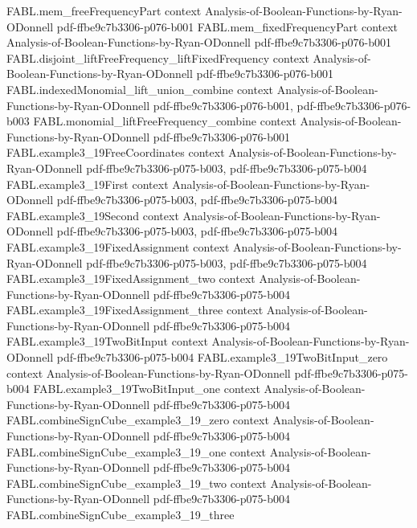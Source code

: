 \begin{theorem}
\proofstep
  {FABL.mem_freeFrequencyPart}
  {context}
  {Analysis-of-Boolean-Functions-by-Ryan-ODonnell}
  {pdf-ffbe9c7b3306-p076-b001}
\proofstep
  {FABL.mem_fixedFrequencyPart}
  {context}
  {Analysis-of-Boolean-Functions-by-Ryan-ODonnell}
  {pdf-ffbe9c7b3306-p076-b001}
\proofstep
  {FABL.disjoint_liftFreeFrequency_liftFixedFrequency}
  {context}
  {Analysis-of-Boolean-Functions-by-Ryan-ODonnell}
  {pdf-ffbe9c7b3306-p076-b001}
\proofstep
  {FABL.indexedMonomial_lift_union_combine}
  {context}
  {Analysis-of-Boolean-Functions-by-Ryan-ODonnell}
  {pdf-ffbe9c7b3306-p076-b001,
    pdf-ffbe9c7b3306-p076-b003}
\proofstep
  {FABL.monomial_liftFreeFrequency_combine}
  {context}
  {Analysis-of-Boolean-Functions-by-Ryan-ODonnell}
  {pdf-ffbe9c7b3306-p076-b001}
\proofstep
  {FABL.example3_19FreeCoordinates}
  {context}
  {Analysis-of-Boolean-Functions-by-Ryan-ODonnell}
  {pdf-ffbe9c7b3306-p075-b003,
    pdf-ffbe9c7b3306-p075-b004}
\proofstep
  {FABL.example3_19First}
  {context}
  {Analysis-of-Boolean-Functions-by-Ryan-ODonnell}
  {pdf-ffbe9c7b3306-p075-b003,
    pdf-ffbe9c7b3306-p075-b004}
\proofstep
  {FABL.example3_19Second}
  {context}
  {Analysis-of-Boolean-Functions-by-Ryan-ODonnell}
  {pdf-ffbe9c7b3306-p075-b003,
    pdf-ffbe9c7b3306-p075-b004}
\proofstep
  {FABL.example3_19FixedAssignment}
  {context}
  {Analysis-of-Boolean-Functions-by-Ryan-ODonnell}
  {pdf-ffbe9c7b3306-p075-b003,
    pdf-ffbe9c7b3306-p075-b004}
\proofstep
  {FABL.example3_19FixedAssignment_two}
  {context}
  {Analysis-of-Boolean-Functions-by-Ryan-ODonnell}
  {pdf-ffbe9c7b3306-p075-b004}
\proofstep
  {FABL.example3_19FixedAssignment_three}
  {context}
  {Analysis-of-Boolean-Functions-by-Ryan-ODonnell}
  {pdf-ffbe9c7b3306-p075-b004}
\proofstep
  {FABL.example3_19TwoBitInput}
  {context}
  {Analysis-of-Boolean-Functions-by-Ryan-ODonnell}
  {pdf-ffbe9c7b3306-p075-b004}
\proofstep
  {FABL.example3_19TwoBitInput_zero}
  {context}
  {Analysis-of-Boolean-Functions-by-Ryan-ODonnell}
  {pdf-ffbe9c7b3306-p075-b004}
\proofstep
  {FABL.example3_19TwoBitInput_one}
  {context}
  {Analysis-of-Boolean-Functions-by-Ryan-ODonnell}
  {pdf-ffbe9c7b3306-p075-b004}
\proofstep
  {FABL.combineSignCube_example3_19_zero}
  {context}
  {Analysis-of-Boolean-Functions-by-Ryan-ODonnell}
  {pdf-ffbe9c7b3306-p075-b004}
\proofstep
  {FABL.combineSignCube_example3_19_one}
  {context}
  {Analysis-of-Boolean-Functions-by-Ryan-ODonnell}
  {pdf-ffbe9c7b3306-p075-b004}
\proofstep
  {FABL.combineSignCube_example3_19_two}
  {context}
  {Analysis-of-Boolean-Functions-by-Ryan-ODonnell}
  {pdf-ffbe9c7b3306-p075-b004}
\proofstep
  {FABL.combineSignCube_example3_19_three}

\end{theorem}
